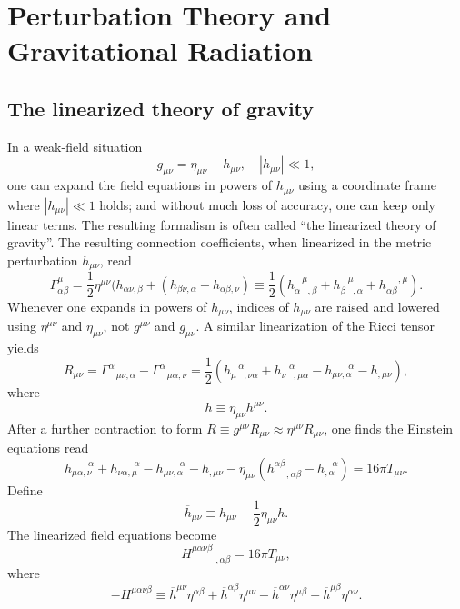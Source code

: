 \documentclass[cyan]{elegantnote}
\author{Yuyang Songsheng}
\begin{document}
\maketitle
\tableofcontents
\chapter{Perturbation Theory and Gravitational Radiation}
\section{The linearized theory of gravity}
In a weak-field situation
\[g_{\mu\nu} = \eta_{\mu\nu} + h_{\mu\nu} , \quad |h_{\mu\nu}| \ll 1 ,\]
one can expand the field equations in powers of $h_{\mu\nu}$ using a coordinate frame where $|h_{\mu\nu}| \ll 1$ holds; and without much loss of accuracy, one can keep only linear terms. The resulting formalism is often called ``the linearized theory of gravity''. The resulting connection coefficients, when linearized in the metric perturbation $h_{\mu\nu}$, read 
\[\Gamma^{\mu}_{\alpha \beta} = \frac{1}{2}\eta^{\mu\nu} (h_{\alpha\nu,\beta} + (h_{\beta\nu,\alpha} - h_{\alpha\beta,\nu}) \equiv \frac{1}{2}(h_{\alpha \phantom{*},\beta}^{\phantom{*} \mu} + h_{\beta \phantom{*},\alpha}^{\phantom{*} \mu} + h_{\alpha\beta}^{\phantom{**} ,\mu} ).\]
Whenever one expands in powers of $h_{\mu\nu}$, indices of $h_{\mu\nu}$ are raised and lowered using $\eta^{\mu\nu}$ and $\eta_{\mu\nu}$, not $g^{\mu\nu}$ and $g_{\mu\nu}$. A similar linearization of the Ricci tensor yields
\[R_{\mu\nu} = \Gamma^{\alpha}_{\phantom{*}\mu\nu,\alpha} - \Gamma^{\alpha}_{\phantom{*}\mu\alpha,\nu} = \frac{1}{2}(h_{\mu \phantom{*},\nu\alpha}^{\phantom{*} \alpha} + h_{\nu \phantom{*},\mu\alpha}^{\phantom{*} \alpha} - h_{\mu\nu,\alpha}^{\phantom{***}\alpha} - h_{,\mu\nu}),\]
where
\[h \equiv \eta_{\mu\nu}h^{\mu\nu}.\]
After a further contraction to form $R \equiv g^{\mu\nu}R_{\mu\nu} \approx \eta^{\mu\nu}R_{\mu\nu}$,
one finds the Einstein equations read
\[h_{\mu\alpha,\nu}^{\phantom{***}\alpha} + h_{\nu\alpha,\mu}^{\phantom{***}\alpha} - h_{\mu\nu,\alpha}^{\phantom{***}\alpha} - h_{,\mu\nu} - \eta_{\mu\nu}(h^{\alpha\beta}_{\phantom{**},\alpha\beta} - h_{,\alpha}^{\phantom{*}\alpha}) = 16\pi T_{\mu\nu}.\]
Define
\[\overline{h}_{\mu\nu} \equiv h_{\mu\nu} - \frac{1}{2}\eta_{\mu\nu}h.\]
The linearized field equations become
\[H^{\mu\alpha\nu\beta}_{\phantom{****},\alpha\beta} = 16\pi T_{\mu\nu},\]
where
\[-H^{\mu\alpha\nu\beta} \equiv \overline{h}^{\mu\nu}\eta^{\alpha\beta} + \overline{h}^{\alpha\beta}\eta^{\mu\nu} - \overline{h}^{\alpha\nu}\eta^{\mu\beta} - \overline{h}^{\mu\beta}\eta^{\alpha\nu} .\]
\end{document}

